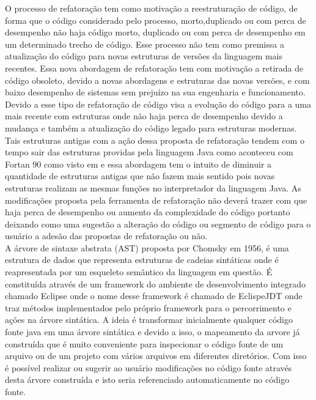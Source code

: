 O processo de refatoração\cite{Schaefer:2010:SIR:1932682.1869485} tem como motivação a reestruturação de código, de forma que o código considerado pelo processo, morto,duplicado ou com perca de desempenho não haja código morto, duplicado ou com perca de desempenho em um determinado trecho de código. Esse processo não tem como premissa a atualização do código para novas estruturas de versões da linguagem mais recentes. Essa nova abordagem de refatoração tem com motivação a retirada de código obsoleto, devido a novas abordagens e estruturas das novas versões, e com baixo desempenho de sistemas sem prejuízo na sua engenharia e funcionamento.\\

Devido a esse tipo de refatoração de código visa a evolução do código para a uma mais recente com estruturas onde não haja perca de desempenho devido a mudança e também a atualização do código legado para estruturas modernas. Tais estruturas antigas com a ação dessa proposta de refatoração tendem com o tempo sair das estruturas providas pela linguagem Java como aconteceu com Fortan 90 como visto em \cite{Overbey:2009:RLR:1639949.1640127} e essa abordagem tem o intuito de diminuir a quantidade de estruturas antigas que não fazem mais sentido pois novas estruturas realizam as mesmas funções no interpretador da linguagem Java. As modificações proposta pela ferramenta de refatoração não deverá trazer com que haja perca de desempenho ou aumento da complexidade do código portanto deixando como uma sugestão a alteração do código ou segmento de código para o usuário a adesão das propostas de refatoração ou não.\\

A árvore de sintaxe abstrata (AST) proposta por Chomsky em 1956\cite{chomsky1956three},  é uma estrutura de dados que representa estruturas de cadeias sintáticas onde é reapresentada por um esqueleto semântico da linguagem em questão. É constituída através de um framework do ambiente de desenvolvimento integrado chamado Eclipse onde o nome desse framework é chamado de EclispeJDT onde traz métodos implementados pelo próprio framework para o percorrimento e ações na árvore sintática. A ideia é transformar inicialmente qualquer código fonte java em uma árvore sintática e devido a isso, o mapeamento da arvore já construída que é muito conveniente para inspecionar o código fonte de um arquivo ou de um projeto com vários arquivos em diferentes diretórios. Com isso é possível realizar ou sugerir ao usuário modificações no código fonte através desta árvore construída e isto seria referenciado automaticamente no código fonte.\\

